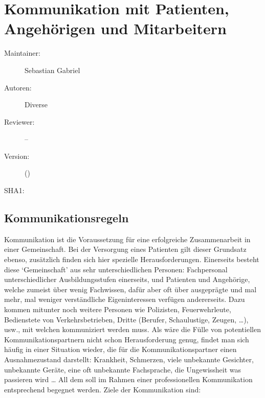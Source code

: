 \def\ChapterCode{KOM}
\chapter
[\CO{[KOM]} Kommunikation mit Patienten, Angehörigen und Mitarbeitern] 
{Kommunikation mit Patienten, Angehörigen und Mitarbeitern}
\label{chp:KOM}

\ChapterIntro
{%

}
{%
\begin{description}
  \item[Maintainer:] Sebastian Gabriel
  \item[Autoren:] Diverse
  \item[Reviewer:] --
  \item[Version:] {\DocVersion} ({\DocVersionInfo})
  \item[SHA1:] {\DocGitCommit}
\end{description}

{\TxTeilkapitelAASS}}

\clearpage

\section{Kommunikationsregeln}
\label{topic:kommunikationsregeln}

\bigskip

Kommunikation ist die Voraussetzung für eine erfolgreiche
Zusammenarbeit in einer Gemeinschaft. Bei der Versorgung
eines Patienten gilt dieser Grundsatz ebenso, zusätzlich
finden sich hier spezielle Herausforderungen. Einerseits
besteht diese \enquote*{Gemeinschaft} aus sehr
unterschiedlichen Personen: Fachpersonal unterschiedlicher
Ausbildungsstufen einerseits, und Patienten und Angehörige,
welche zumeist über wenig Fachwissen, dafür aber oft über
ausgeprägte und mal mehr, mal weniger verständliche
Eigeninteressen verfügen andererseits. Dazu kommen mitunter
noch weitere Personen wie Polizisten, Feuerwehrleute,
Bedienstete von Verkehrsbetrieben, Dritte (Berufer,
Schaulustige, Zeugen, \ldots), usw., mit welchen
kommuniziert werden muss. 
Als wäre die Fülle von potentiellen Kommunikationspartnern
nicht schon Herausforderung genug, findet man sich häufig in einer
Situation wieder, die für die Kommunikationspartner einen
Ausnahmezustand darstellt: Krankheit, Schmerzen,
viele unbekannte Gesichter, unbekannte Geräte, eine oft
unbekannte Fachsprache, die Ungewissheit was passieren wird
{\ldots} All dem soll im Rahmen einer professionellen
Kommunikation entsprechend begegnet werden. 
Ziele der Kommunikation sind:

